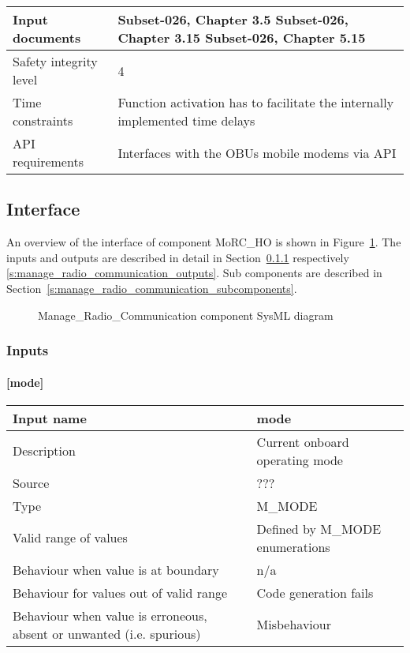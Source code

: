 \begin{longtable}{p{}p{}}
\\
\midrule
Input documents	& 
Subset-026, Chapter 3.5 \newline
Subset-026, Chapter 3.15 \newline
Subset-026, Chapter 5.15 \\
\midrule
Safety integrity level	& 4 \\
\midrule
Time constraints		& Function activation has to facilitate the internally implemented time delays  \\
\midrule
API requirements 		& Interfaces with the OBUs mobile modems via API\\
\bottomrule
\end{longtable}


\subsection{Interface}

An overview of the interface of component MoRC\_HO is shown in Figure~\ref{f:manage_radio_communication_interface}. The inputs and outputs are described in detail in Section~\ref{s:manage_radio_communication_inputs} respectively \ref{s:manage_radio_communication_outputs}. Sub components are described in Section~\ref{s:manage_radio_communication_subcomponents}.

\begin{figure}
\center
{}
\caption{Manage\_Radio\_Communication component SysML diagram}\label{f:manage_radio_communication_interface}
\end{figure}


\subsubsection{Inputs}\label{s:manage_radio_communication_inputs}

\paragraph{[mode]}

\begin{longtable}{p{}p{}}
\toprule
Input name				& mode \\
\midrule
Description				& Current onboard operating mode \\
\midrule
Source					& ??? \\ 
\midrule
Type					& M\_MODE \\
\midrule
Valid range of values	& Defined by M\_MODE enumerations \\
\midrule
Behaviour when value is at boundary	& n/a \\
\midrule
Behaviour for values out of valid range	& Code generation fails \\
\midrule
Behaviour when value is erroneous, absent or unwanted (i.e. spurious) & Misbehaviour \\
\bottomrule
\end{longtable}


